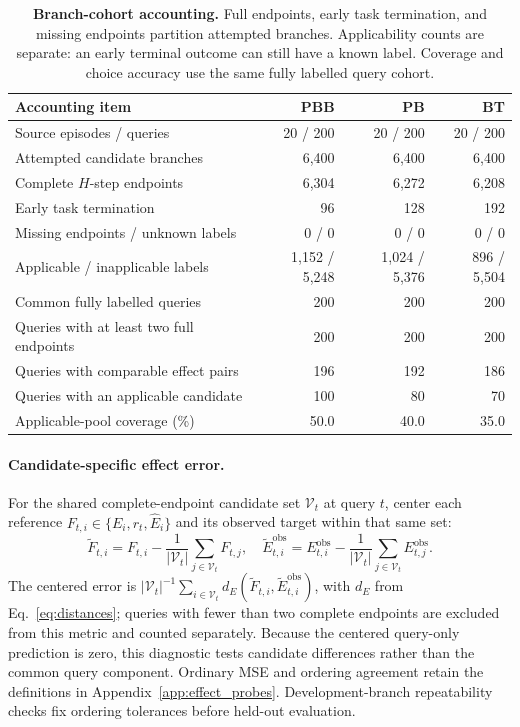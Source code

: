 \begin{table}[H]
\centering\small
\caption{\textbf{Branch-cohort accounting.}
Full endpoints, early task termination, and missing endpoints partition attempted branches.
Applicability counts are separate: an early terminal outcome can still have a known label.
Coverage and choice accuracy use the same fully labelled query cohort.}
\label{tab:rebuttal_coverage}
\begin{tabular}{@{}lrrr@{}}
\toprule
Accounting item & PBB & PB & BT \\
\midrule
Source episodes / queries & 20 / 200 & 20 / 200 & 20 / 200 \\
Attempted candidate branches & 6,400 & 6,400 & 6,400 \\
Complete $H$-step endpoints & 6,304 & 6,272 & 6,208 \\
Early task termination & 96 & 128 & 192 \\
Missing endpoints / unknown labels & 0 / 0 & 0 / 0 & 0 / 0 \\
Applicable / inapplicable labels & 1,152 / 5,248 & 1,024 / 5,376 & 896 / 5,504 \\
Common fully labelled queries & 200 & 200 & 200 \\
Queries with at least two full endpoints & 200 & 200 & 200 \\
Queries with comparable effect pairs & 196 & 192 & 186 \\
Queries with an applicable candidate & 100 & 80 & 70 \\
Applicable-pool coverage (\%) & 50.0 & 40.0 & 35.0 \\
\bottomrule
\end{tabular}
\end{table}

\paragraph{Candidate-specific effect error.}
For the shared complete-endpoint candidate set $\mathcal V_t$ at query $t$, center each reference $F_{t,i}\in\{E_i,r_t,\widehat E_i\}$ and its observed target within that same set:
\begin{equation}
 \widetilde F_{t,i}=F_{t,i}-\frac{1}{|\mathcal V_t|}\sum_{j\in\mathcal V_t}F_{t,j},\quad
 \widetilde E^{\mathrm{obs}}_{t,i}=E^{\mathrm{obs}}_{t,i}
 -\frac{1}{|\mathcal V_t|}\sum_{j\in\mathcal V_t}E^{\mathrm{obs}}_{t,j}.
 \label{eq:rebuttal_centering}
\end{equation}
The centered error is $|\mathcal V_t|^{-1}\sum_{i\in\mathcal V_t}d_E(\widetilde F_{t,i},\widetilde E^{\mathrm{obs}}_{t,i})$, with $d_E$ from Eq.~\eqref{eq:distances}; queries with fewer than two complete endpoints are excluded from this metric and counted separately.
Because the centered query-only prediction is zero, this diagnostic tests candidate differences rather than the common query component.
Ordinary MSE and ordering agreement retain the definitions in Appendix~\ref{app:effect_probes}.
Development-branch repeatability checks fix ordering tolerances before held-out evaluation.

